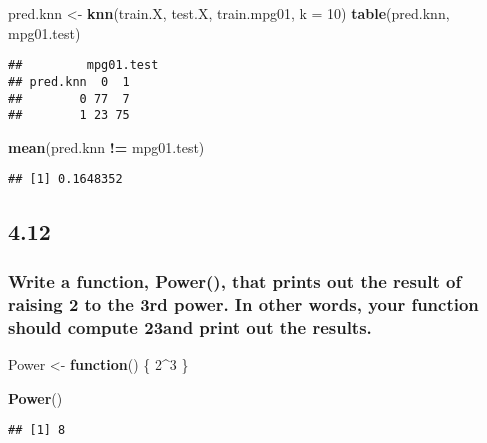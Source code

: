 \documentclass[]{article}
\newenvironment{Shaded}{\begin{snugshade}}{\end{snugshade}}
\newcommand{\KeywordTok}[1]{\textcolor[rgb]{0.13,0.29,0.53}{\textbf{#1}}}
\newcommand{\DataTypeTok}[1]{\textcolor[rgb]{0.13,0.29,0.53}{#1}}
\newcommand{\DecValTok}[1]{\textcolor[rgb]{0.00,0.00,0.81}{#1}}
\newcommand{\StringTok}[1]{\textcolor[rgb]{0.31,0.60,0.02}{#1}}
\newcommand{\ControlFlowTok}[1]{\textcolor[rgb]{0.13,0.29,0.53}{\textbf{#1}}}
\newcommand{\OperatorTok}[1]{\textcolor[rgb]{0.81,0.36,0.00}{\textbf{#1}}}
\newcommand{\NormalTok}[1]{#1}
\begin{document}
\begin{Shaded}
\begin{Highlighting}[]
\NormalTok{pred.knn <-}\StringTok{ }\KeywordTok{knn}\NormalTok{(train.X, test.X, train.mpg01, }\DataTypeTok{k =} \DecValTok{10}\NormalTok{)}
\KeywordTok{table}\NormalTok{(pred.knn, mpg01.test)}
\end{Highlighting}
\end{Shaded}

\begin{verbatim}
##         mpg01.test
## pred.knn  0  1
##        0 77  7
##        1 23 75
\end{verbatim}

\begin{Shaded}
\begin{Highlighting}[]
\KeywordTok{mean}\NormalTok{(pred.knn }\OperatorTok{!=}\StringTok{ }\NormalTok{mpg01.test)}
\end{Highlighting}
\end{Shaded}

\begin{verbatim}
## [1] 0.1648352
\end{verbatim}

\subsection{4.12}\label{section-1}

\subsubsection{Write a function, Power(), that prints out the result of
raising 2 to the 3rd power. In other words, your function should compute
23and print out the
results.}\label{write-a-function-power-that-prints-out-the-result-of-raising-2-to-the-3rd-power.-in-other-words-your-function-should-compute-23and-print-out-the-results.}

\begin{Shaded}
\begin{Highlighting}[]
\NormalTok{Power <-}\StringTok{ }\ControlFlowTok{function}\NormalTok{() \{}
    \DecValTok{2}\OperatorTok{^}\DecValTok{3}
\NormalTok{\}}

\KeywordTok{Power}\NormalTok{()}
\end{Highlighting}
\end{Shaded}

\begin{verbatim}
## [1] 8
\end{verbatim}
\end{document}
